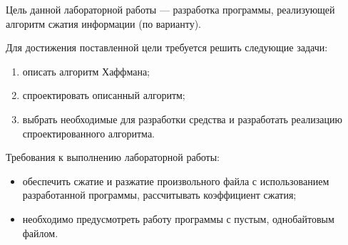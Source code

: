
Цель данной лабораторной работы --- разработка программы, реализующей алгоритм сжатия информации (по варианту).

Для достижения поставленной цели требуется решить следующие задачи:
\begin{enumerate}
	\item описать алгоритм Хаффмана;
	\item спроектировать описанный алгоритм;
	\item выбрать необходимые для разработки средства и разработать реализацию спроектированного алгоритма.
\end{enumerate}

Требования к выполнению лабораторной работы:
\begin{itemize}
	\item обеспечить сжатие и разжатие произвольного файла с использованием разработанной программы, рассчитывать коэффициент сжатия;
	\item необходимо предусмотреть работу программы с пустым, однобайтовым файлом.
\end{itemize}